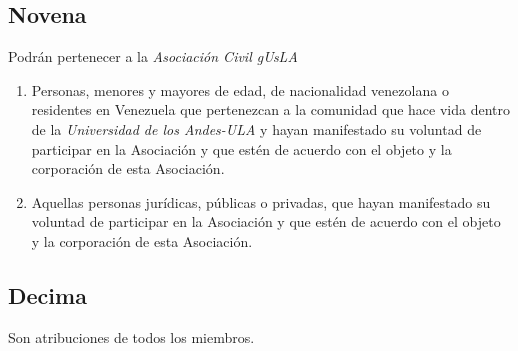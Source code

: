       \subsection{Novena}
        Podr\'an pertenecer a la \emph{Asociaci\'on Civil gUsLA}
        
        \begin{enumerate}

          \item 
            Personas, menores y mayores de edad, de nacionalidad venezolana o
            residentes en Venezuela que pertenezcan a la comunidad que hace vida
	    dentro de la \emph{Universidad de los Andes-ULA} y hayan manifestado
	    su voluntad de participar en la Asociaci\'on y que est\'en de acuerdo
	    con el objeto y la corporaci\'on de esta Asociaci\'on.

          \item 
            Aquellas personas jur\'i{}dicas, p\'ublicas o privadas, que hayan
            manifestado su voluntad de participar en la Asociaci\'on y que
            est\'en de acuerdo con el objeto y la corporaci\'on de esta
            Asociaci\'on.

        \end{enumerate}

      \subsection{Decima}
        Son atribuciones de todos los miembros.

